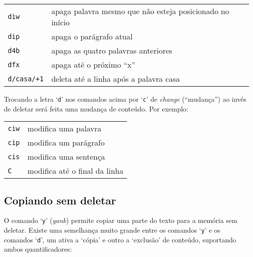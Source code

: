 \begin{table}[htb]\begin{center} \begin{tabular}{ll} \hline
     \verb|diw| & apaga palavra mesmo que não esteja posicionado no início\\
     \verb|dip| & apaga o parágrafo atual\\
     \verb|d4b| & apaga as quatro palavras anteriores\\
     \verb|dfx| & apaga até o próximo ``x''\\
     \verb|d/casa/+1| & deleta até a linha após a palavra casa\\
\hline \end{tabular}\end{center}\end{table}

Trocando a letra `{\tt d}' nos comandos acima por `{\tt c}' de {\em change}
(``mudança'') ao invés de deletar será feita uma mudança de conteúdo.  Por
exemplo:
\begin{table}[htb]\begin{center} \begin{tabular}{ll} \hline
     \verb|ciw| & modifica uma palavra \\
     \verb|cip| & modifica um parágrafo\\
     \verb|cis| & modifica uma sentença\\
     \verb|C| &  modifica até o final da linha\\
\hline \end{tabular}\end{center}\end{table}

\subsection{Copiando sem deletar}\label{Copiando sem deletar}

O comando `{\tt y}' ({\em yank}) permite copiar uma parte do 
texto para a memória sem deletar.  Existe uma semelhança muito grande entre 
os comandos `{\tt y}' e os comandos `{\tt d}', um ativa a `cópia' e outro a 
`exclusão' de conteúdo, suportando ambos quantificadores:

